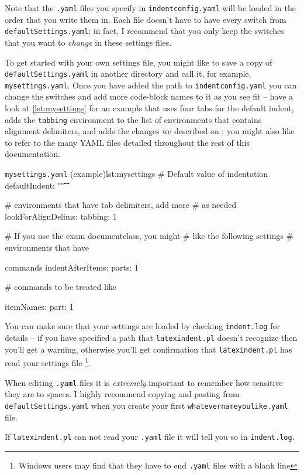 	Note that the \texttt{.yaml} files you specify in \texttt{indentconfig.yaml}
	will be loaded in the order that you write them in. Each file doesn't have
	to have every switch from \texttt{defaultSettings.yaml}; in fact, I recommend
	that you only keep the switches that you want to \emph{change} in these
	settings files.

	To get started with your own settings file, you might like to save a copy of
	\texttt{defaultSettings.yaml} in another directory and call it, for
	example, \texttt{mysettings.yaml}. Once you have added the path to \texttt{indentconfig.yaml}
	you can change the switches and add more code-block names to it
	as you see fit -- have a look at \cref{lst:mysettings} for an example
	that uses four tabs for the default indent, adds the \texttt{tabbing}
	environment to the list of environments that contains alignment delimiters,
	and adds the changes we described on ; you might also like to
	refer to the many YAML files detailed throughout the rest of this documentation.

	\begin{yaml}{\texttt{mysettings.yaml} (example)}{lst:mysettings}
	# Default value of indentation
	defaultIndent: "\t\t\t\t"

	# environments that have tab delimiters, add more
	# as needed
	lookForAlignDelims:
	tabbing: 1

	# If you use the exam documentclass, you might
	# like the following settings
	# environments that have \item commands
	indentAfterItems:
	parts: 1

	# commands to be treated like \item
	itemNames:
	part: 1
\end{yaml}

	You can make sure that your settings are loaded by checking \texttt{indent.log}
	for details -- if you have specified a path that \texttt{latexindent.pl} doesn't
	recognize then you'll get a warning, otherwise you'll get confirmation that
	\texttt{latexindent.pl} has read your settings file \footnote{Windows users
		may find that they have to end \texttt{.yaml} files with a blank line}.

	\begin{warning}
		When editing \texttt{.yaml} files it is \emph{extremely} important
		to remember how sensitive they are to spaces. I highly recommend copying
		and pasting from \texttt{defaultSettings.yaml} when you create your
		first \texttt{whatevernameyoulike.yaml} file.

		If \texttt{latexindent.pl} can not read your \texttt{.yaml} file it
		will tell you so in \texttt{indent.log}.
	\end{warning}

